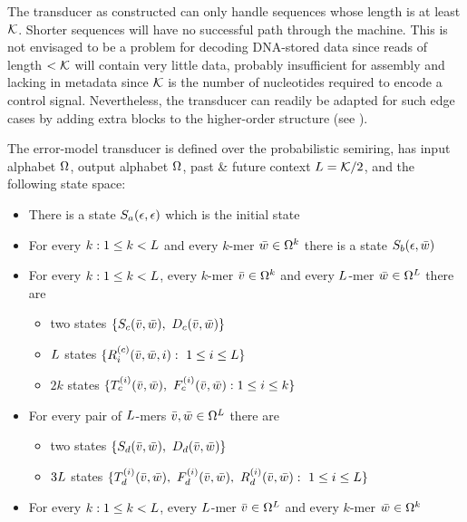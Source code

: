 \documentclass[english]{article}
\begin{document}
The transducer as constructed can only handle sequences whose length is at least ${\cal K}$.
Shorter sequences will have no successful path through the machine.
This is not envisaged to be a problem for decoding DNA-stored data
since reads of length $<{\cal K}$ will contain very little data,
probably insufficient for assembly and lacking in metadata
since ${\cal K}$ is the number of nucleotides required to encode a control signal.
Nevertheless, the transducer can readily be adapted for such edge cases
by adding extra blocks to the higher-order structure (see ).

The error-model transducer is defined over the probabilistic semiring,
has input alphabet $\Omega$,
output alphabet $\Omega$,
past \& future context $L={\cal K}/2$,
and the following state space:
\begin{itemize}
\item There is a state ${S}_{a}(\epsilon,\epsilon)$ which is the initial state
\item For every $k:1 \leq k < L$ and every $k$-mer $\bar{w} \in \Omega^k$
  there is a state ${S}_{b}(\epsilon,\bar{w})$
\item For every $k:1 \leq k < L$, every $k$-mer $\bar{v} \in \Omega^k$ and every $L$-mer $\bar{w} \in \Omega^L$
  there are
  \begin{itemize}
  \item two states $\{ {S}_{c}(\bar{v},\bar{w}),\ {D}_{c}(\bar{v},\bar{w}) \}$
  \item $L$ states $\{ {R}_{i}^{(c)}(\bar{v},\bar{w},i):\ 1 \leq i \leq L \}$
  \item $2k$ states $\{ {T}_{c}^{(i)}(\bar{v},\bar{w}),\ {F}_{c}^{(i)}(\bar{v},\bar{w}): 1 \leq i \leq k \}$
  \end{itemize}
\item For every pair of $L$-mers $\bar{v}, \bar{w} \in \Omega^L$
  there are
  \begin{itemize}
  \item two states $\{ {S}_{d}(\bar{v},\bar{w}),\ {D}_{d}(\bar{v},\bar{w}) \}$
  \item $3L$ states $\{ \tanstate{d}{i}(\seqpast,\seqnext),\ \fwdstate{d}{i}(\seqpast,\seqnext),\ \revstate{d}{i}(\seqpast,\seqnext):\ 1 \leq i \leq \contextlen \}$
  \end{itemize}
\item For every $k:1 \leq k < L$, every $L$-mer $\bar{v} \in \Omega^L$ and every $k$-mer $\bar{w} \in \Omega^k$

\end{itemize}
\end{document}

